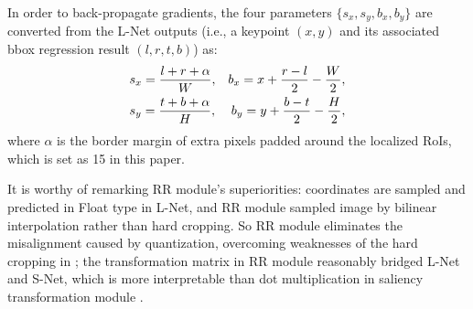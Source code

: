 \documentclass{article}
\begin{document}
In order to back-propagate gradients, the four parameters $\{s_x, s_y, b_x, b_y\}$ are converted from the L-Net outputs (i.e., a keypoint $(x,y)$ and its associated bbox regression result $(l,r,t,b)$) as:
\vspace{-5pt}
\begin{align}
&s_x = \frac{l + r + \alpha}{W}, &b_x = x + \frac{r - l}{2} - \frac{W}{2}, \notag\\
&s_y = \frac{t + b + \alpha}{H}, &b_y = y + \frac{b - t}{2} - \frac{H}{2},
\label{f:totetha}\vspace{-5pt}
\end{align}
where $\alpha$ is the border margin of extra pixels padded around the localized RoIs, which is set as 15 in this paper.

It is worthy of remarking RR module's superiorities: coordinates are sampled and predicted in Float type in L-Net, and RR module sampled image by bilinear interpolation rather than hard cropping. So RR module eliminates the misalignment caused by quantization, overcoming weaknesses of the hard cropping in \cite{zhou2017fixed,RSTN}; the transformation matrix \bm{$\theta$} in RR module reasonably bridged L-Net and S-Net, which is more interpretable than dot multiplication in saliency transformation module \cite{RSTN}.




\end{document}
